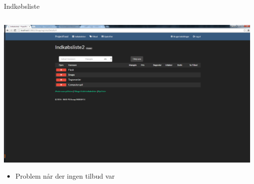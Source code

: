 \begin{frame}{Indkøbsliste}
	\begin{minipage}[0.3\textheight]{\textwidth}
	\begin{columns}[T]
	\begin{column}{1\textwidth}
	\vspace{-15 pt}
	 \includegraphics[width=1\textwidth,height=1\textheight,keepaspectratio, trim={1cm 0 0 16mm}, clip]{images/Screenshots/ShoppingListOld.png}
	 
	 \begin{itemize}
	 	\item Problem når der ingen tilbud var
	 \end{itemize}
	
	\end{column}

	\end{columns}

  \end{minipage}
	
\end{frame}
